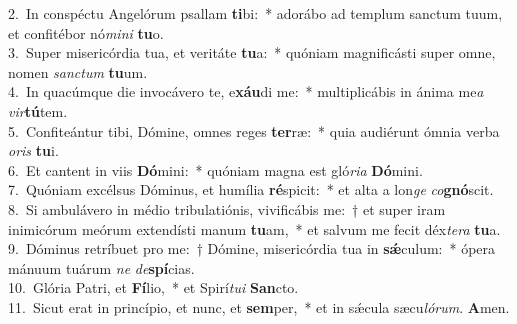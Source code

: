{2.~}In conspéctu Angelórum psallam \textbf{ti}bi:~* adorábo ad templum sanctum tuum, et confitébor nó\textit{mi}\textit{ni} \textbf{tu}o.\\
{3.~}Super misericórdia tua, et veritáte \textbf{tu}a:~* quóniam magnificásti super omne, nomen \textit{san}\textit{ctum} \textbf{tu}um.\\
{4.~}In quacúmque die invocávero te, e\textbf{xáu}di me:~* multiplicábis in ánima me\textit{a} \textit{vir}\textbf{tú}tem.\\
{5.~}Confiteántur tibi, Dómine, omnes reges \textbf{ter}ræ:~* quia audiérunt ómnia verba \textit{o}\textit{ris} \textbf{tu}i.\\
{6.~}Et cantent in viis \textbf{Dó}mini:~* quóniam magna est gló\textit{ri}\textit{a} \textbf{Dó}mini.\\
{7.~}Quóniam excélsus Dóminus, et humília \textbf{ré}spicit:~* et alta a lon\textit{ge} \textit{co}\textbf{gnó}scit.\\
{8.~}Si ambulávero in médio tribulatiónis, vivificábis me:~† et super iram inimicórum meórum extendísti manum \textbf{tu}am,~* et salvum me fecit déx\textit{te}\textit{ra} \textbf{tu}a.\\
{9.~}Dóminus retríbuet pro me:~† Dómine, misericórdia tua in \textbf{sǽ}culum:~* ópera mánuum tuárum \textit{ne} \textit{de}\textbf{spí}cias.\\
{10.~}Glória Patri, et \textbf{Fí}lio,~* et Spirí\textit{tu}\textit{i} \textbf{San}cto.\\
{11.~}Sicut erat in princípio, et nunc, et \textbf{sem}per,~* et in sǽcula sæcu\textit{ló}\textit{rum}. \textbf{A}men.\\
